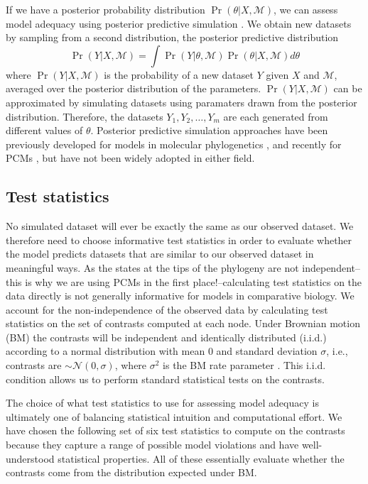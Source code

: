 If we have a posterior probability distribution $\Pr(\theta|X, \mathcal{M})$, we can assess model adequacy using posterior predictive simulation \citep{Rubin1984, Gelman1996}. We obtain new datasets by sampling from a second distribution, the posterior predictive distribution
\begin{equation}
\Pr(Y|X,\mathcal{M}) = \int \Pr(Y|\theta, \mathcal{M})\Pr(\theta |X,\mathcal{M})d\theta
\end{equation}
where $\Pr(Y|X,\mathcal{M})$ is the probability of a new dataset $Y$ given $X$ and $\mathcal{M}$, averaged over the posterior distribution of the parameters. $\Pr(Y|X,\mathcal{M})$ can be approximated by simulating datasets using paramaters drawn from the posterior distribution. Therefore, the datasets $Y_1, Y_2, \ldots, Y_m$ are each generated from different values of $\theta$. Posterior predictive simulation approaches have been previously developed for models in molecular phylogenetics \citep{Bollback2002, Reid2013, Lewis2013, Brown2013}, and recently for PCMs \citep{SlaterPennell}, but have not been widely adopted in either field.

\subsection{Test statistics}
No simulated dataset will ever be exactly the same as our observed dataset. We therefore need to choose informative test statistics in order to evaluate whether the model predicts datasets that are similar to our observed dataset in meaningful ways. As the states at the tips of the phylogeny are not independent--this is why we are using PCMs in the first place!--calculating test statistics on the data directly is not generally informative for models in comparative biology. We account for the non-independence of the observed data by calculating test statistics on the set of contrasts \citep[i.e., ``phylogenetically independent contrasts'';][]{Felsenstein1985} computed at each node. \citep[We refer readers to][for details on how contrasts are calculated.]{Felsenstein1985, Rohlf2001, Blomberg2012} Under Brownian motion (BM) the contrasts will be independent and identically distributed (i.i.d.) according to a normal distribution with mean 0 and standard deviation $\sigma$, i.e., contrasts are $\sim \mathcal{N}(\text{0}, \sigma)$, where $\sigma^2$ is the BM rate parameter \citep{Felsenstein1985}. This i.i.d. condition allows us to perform standard statistical tests on the contrasts. 

The choice of what test statistics to use for assessing model adequacy is ultimately one of balancing statistical intuition and computational effort. We have chosen the following set of six test statistics to compute on the contrasts because they capture a range of possible model violations and have well-understood statistical properties. All of these essentially evaluate whether the contrasts come from the distribution expected under BM. 


